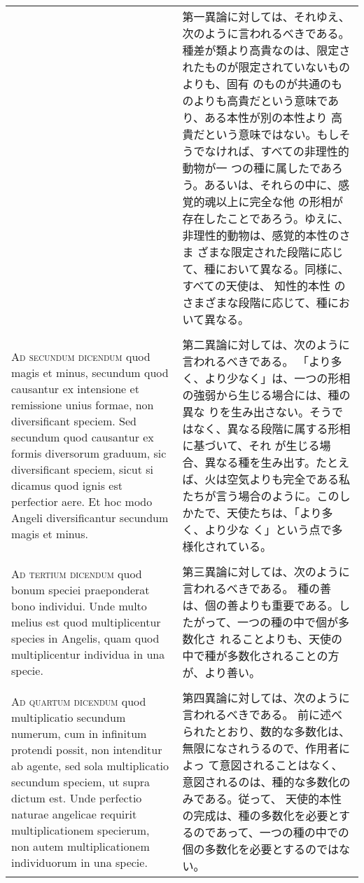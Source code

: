 \documentclass[10pt]{jsarticle} %
\begin{document}
\begin{longtable}{p{21em}p{21em}}
&

第一異論に対しては、それゆえ、次のように言われるべきである。
種差が類より高貴なのは、限定されたものが限定されていないものよりも、固有
 のものが共通のものよりも高貴だという意味であり、ある本性が別の本性より
 高貴だという意味ではない。もしそうでなければ、すべての非理性的動物が一
 つの種に属したであろう。あるいは、それらの中に、感覚的魂以上に完全な他
 の形相が存在したことであろう。ゆえに、非理性的動物は、感覚的本性のさま
 ざまな限定された段階に応じて、種において異なる。同様に、すべての天使は、
 知性的本性 のさまざまな段階に応じて、種において異なる。



\\\\


{\scshape Ad secundum dicendum} quod magis et minus,
secundum quod causantur ex intensione et remissione unius formae, non
diversificant speciem. Sed secundum quod causantur ex formis diversorum
graduum, sic diversificant speciem, sicut si dicamus quod ignis est
perfectior aere. Et hoc modo Angeli diversificantur secundum magis et
minus.


&


第二異論に対しては、次のように言われるべきである。
「より多く、より少なく」は、一つの形相の強弱から生じる場合には、種の異な
 りを生み出さない。そうではなく、異なる段階に属する形相に基づいて、それ
 が生じる場合、異なる種を生み出す。たとえば、火は空気よりも完全である私
 たちが言う場合のように。このしかたで、天使たちは、「より多く、より少な
 く」という点で多様化されている。

\\\\


{\scshape Ad tertium dicendum} quod bonum speciei
praeponderat bono individui. Unde multo melius est quod multiplicentur
species in Angelis, quam quod multiplicentur individua in una specie.

&

第三異論に対しては、次のように言われるべきである。
種の善は、個の善よりも重要である。したがって、一つの種の中で個が多数化さ
 れることよりも、天使の中で種が多数化されることの方が、より善い。


\\\\


{\scshape Ad quartum dicendum} quod multiplicatio
secundum numerum, cum in infinitum protendi possit, non intenditur ab
agente, sed sola multiplicatio secundum speciem, ut supra dictum
est. Unde perfectio naturae angelicae requirit multiplicationem
specierum, non autem multiplicationem individuorum in una specie.


&

第四異論に対しては、次のように言われるべきである。
前に述べられたとおり、数的な多数化は、無限になされうるので、作用者によっ
 て意図されることはなく、意図されるのは、種的な多数化のみである。従って、
 天使的本性の完成は、種の多数化を必要とするのであって、一つの種の中での
 個の多数化を必要とするのではない。




\end{longtable}
\end{document}

